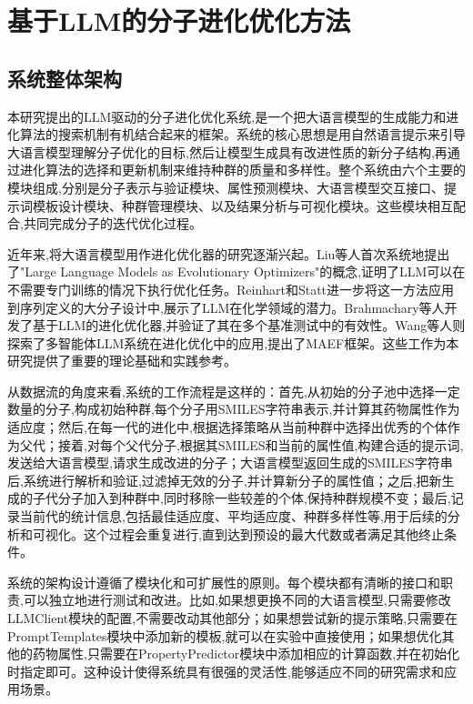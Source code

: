 \chapter{基于LLM的分子进化优化方法}
\vspace{7pt}


\section{系统整体架构}

本研究提出的LLM驱动的分子进化优化系统,是一个把大语言模型的生成能力和进化算法的搜索机制有机结合起来的框架。系统的核心思想是用自然语言提示来引导大语言模型理解分子优化的目标,然后让模型生成具有改进性质的新分子结构,再通过进化算法的选择和更新机制来维持种群的质量和多样性。整个系统由六个主要的模块组成,分别是分子表示与验证模块、属性预测模块、大语言模型交互接口、提示词模板设计模块、种群管理模块、以及结果分析与可视化模块。这些模块相互配合,共同完成分子的迭代优化过程。

近年来,将大语言模型用作进化优化器的研究逐渐兴起。Liu等人\cite{liu2023llm}首次系统地提出了"Large Language Models as Evolutionary Optimizers"的概念,证明了LLM可以在不需要专门训练的情况下执行优化任务。Reinhart和Statt\cite{reinhart2024llm}进一步将这一方法应用到序列定义的大分子设计中,展示了LLM在化学领域的潜力。Brahmachary等人\cite{brahmachary2024llm}开发了基于LLM的进化优化器,并验证了其在多个基准测试中的有效性。Wang等人\cite{wang2025multi}则探索了多智能体LLM系统在进化优化中的应用,提出了MAEF框架。这些工作为本研究提供了重要的理论基础和实践参考。

从数据流的角度来看,系统的工作流程是这样的：首先,从初始的分子池中选择一定数量的分子,构成初始种群,每个分子用SMILES字符串表示,并计算其药物属性作为适应度；然后,在每一代的进化中,根据选择策略从当前种群中选择出优秀的个体作为父代；接着,对每个父代分子,根据其SMILES和当前的属性值,构建合适的提示词,发送给大语言模型,请求生成改进的分子；大语言模型返回生成的SMILES字符串后,系统进行解析和验证,过滤掉无效的分子,并计算新分子的属性值；之后,把新生成的子代分子加入到种群中,同时移除一些较差的个体,保持种群规模不变；最后,记录当前代的统计信息,包括最佳适应度、平均适应度、种群多样性等,用于后续的分析和可视化。这个过程会重复进行,直到达到预设的最大代数或者满足其他终止条件。

系统的架构设计遵循了模块化和可扩展性的原则。每个模块都有清晰的接口和职责,可以独立地进行测试和改进。比如,如果想更换不同的大语言模型,只需要修改LLMClient模块的配置,不需要改动其他部分；如果想尝试新的提示策略,只需要在PromptTemplates模块中添加新的模板,就可以在实验中直接使用；如果想优化其他的药物属性,只需要在PropertyPredictor模块中添加相应的计算函数,并在初始化时指定即可。这种设计使得系统具有很强的灵活性,能够适应不同的研究需求和应用场景。

